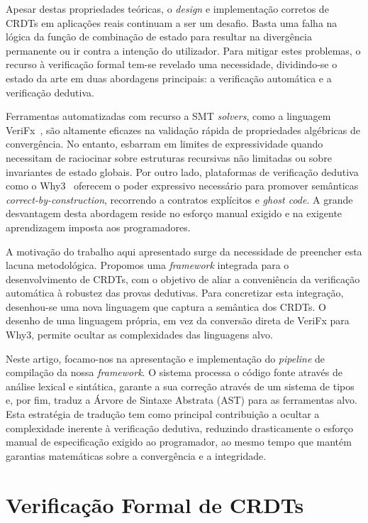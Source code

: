 \documentclass{llncs}
\begin{document}
Apesar destas propriedades teóricas, o \textit{design} e implementação corretos de CRDTs em aplicações reais continuam a ser um desafio.
Basta uma falha na lógica da função de combinação de estado para resultar na divergência permanente ou ir contra a intenção do utilizador.
Para mitigar estes problemas, o recurso à verificação formal tem-se revelado uma necessidade,
dividindo-se o estado da arte em duas abordagens principais: a verificação automática e a verificação dedutiva.

Ferramentas automatizadas com recurso a SMT \textit{solvers}, como a linguagem VeriFx~\cite{porre2023masses}, são altamente eficazes na validação rápida de propriedades algébricas de convergência.
No entanto, esbarram em limites de expressividade quando necessitam de raciocinar sobre estruturas recursivas não limitadas ou sobre invariantes de estado globais.
Por outro lado, plataformas de verificação dedutiva como o Why3~\cite{why3} oferecem o poder expressivo necessário para promover semânticas \textit{correct-by-construction},
recorrendo a contratos explícitos e \textit{ghost code}. A grande desvantagem desta abordagem reside no esforço manual exigido e na exigente aprendizagem imposta aos programadores.

A motivação do trabalho aqui apresentado surge da necessidade de preencher esta lacuna metodológica. Propomos uma \textit{framework} integrada para o desenvolvimento de CRDTs,
com o objetivo de aliar a conveniência da verificação automática à robustez das provas dedutivas. Para concretizar esta integração,
desenhou-se uma nova linguagem que captura a semântica dos CRDTs. O desenho de uma linguagem própria, em vez da conversão direta de VeriFx para Why3,
permite ocultar as complexidades das linguagens alvo.

Neste artigo, focamo-nos na apresentação e implementação do \textit{pipeline} de compilação da nossa \textit{framework}. O sistema processa o código fonte através de análise lexical e sintática,
garante a sua correção através de um sistema de tipos e, por fim, traduz a Árvore de Sintaxe Abstrata (AST) para as ferramentas alvo.
Esta estratégia de tradução tem como principal contribuição a ocultar a complexidade inerente à verificação dedutiva,
reduzindo drasticamente o esforço manual de especificação exigido ao programador, ao mesmo tempo que mantém garantias matemáticas sobre a convergência e a integridade.

\section{Verificação Formal de CRDTs}
\end{document}

